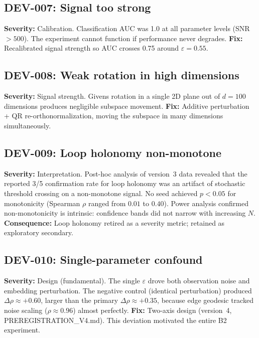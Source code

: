 \documentclass[11pt]{article}
\newcommand{\eps}{\varepsilon}
\begin{document}
\subsection*{DEV-007: Signal too strong}
\textbf{Severity:} Calibration.
Classification AUC was 1.0 at all parameter levels (SNR $> 500$).
The experiment cannot function if performance never degrades.
\textbf{Fix:} Recalibrated signal strength so AUC crosses 0.75
around $\eps = 0.55$.

\subsection*{DEV-008: Weak rotation in high dimensions}
\textbf{Severity:} Signal strength.
Givens rotation in a single 2D plane out of $d = 100$ dimensions
produces negligible subspace movement.
\textbf{Fix:} Additive perturbation + QR re-orthonormalization,
moving the subspace in many dimensions simultaneously.

\subsection*{DEV-009: Loop holonomy non-monotone}
\textbf{Severity:} Interpretation.
Post-hoc analysis of version~3 data revealed that the reported
3/5 confirmation rate for loop holonomy was an artifact of
stochastic threshold crossing on a non-monotone signal.  No seed
achieved $p < 0.05$ for monotonicity (Spearman $\rho$ ranged from
$0.01$ to $0.40$).  Power analysis confirmed non-monotonicity is
intrinsic: confidence bands did not narrow with increasing $N$.
\textbf{Consequence:} Loop holonomy retired as a severity metric;
retained as exploratory secondary.

\subsection*{DEV-010: Single-parameter confound}
\textbf{Severity:} Design (fundamental).
The single $\eps$ drove both observation noise and embedding
perturbation.  The negative control (identical perturbation)
produced $\Delta\rho \approx +0.60$, larger than the primary
$\Delta\rho \approx +0.35$, because edge geodesic tracked noise
scaling ($\rho \approx 0.96$) almost perfectly.
\textbf{Fix:} Two-axis design (version~4, PREREGISTRATION\_V4.md).
This deviation motivated the entire B2 experiment.
\end{document}
